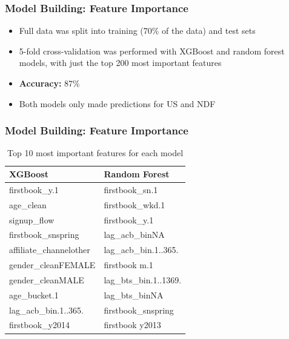 \documentclass{beamer}
\begin{document}

\begin{frame}
\frametitle{Model Building: Feature Importance}
\begin{itemize}
  \item Full data was split into training (70\% of the data) and test sets
  \item 5-fold cross-validation was performed with XGBoost and random forest models, with just the top 200 most important features
  \item \textbf{Accuracy:} 87\%
  \item Both models only made predictions for US and NDF
\end{itemize}
\end{frame}


\begin{frame}
\frametitle{Model Building: Feature Importance}
\begin{table}[ht]
\centering
\begin{tabular}{| l | l |}
  \hline
  \textbf{XGBoost} & \textbf{Random Forest} \\ 
  \hline
  firstbook\_y.1 & firstbook\_sn.1 \\
  age\_clean & firstbook\_wkd.1 \\
  signup\_flow & firstbook\_y.1 \\
  firstbook\_snspring & lag\_acb\_binNA \\
  affiliate\_channelother & lag\_acb\_bin.1..365. \\
  gender\_cleanFEMALE & firstbook m.1 \\
  gender\_cleanMALE & lag\_bts\_bin.1..1369. \\
  age\_bucket.1 & lag\_bts\_binNA \\
  lag\_acb\_bin.1..365. & firstbook\_snspring \\
  firstbook\_y2014 & firstbook y2013 \\
  \hline
\end{tabular}
\caption{Top 10 most important features for each model}
\end{table}
\end{frame}

\end{document}
